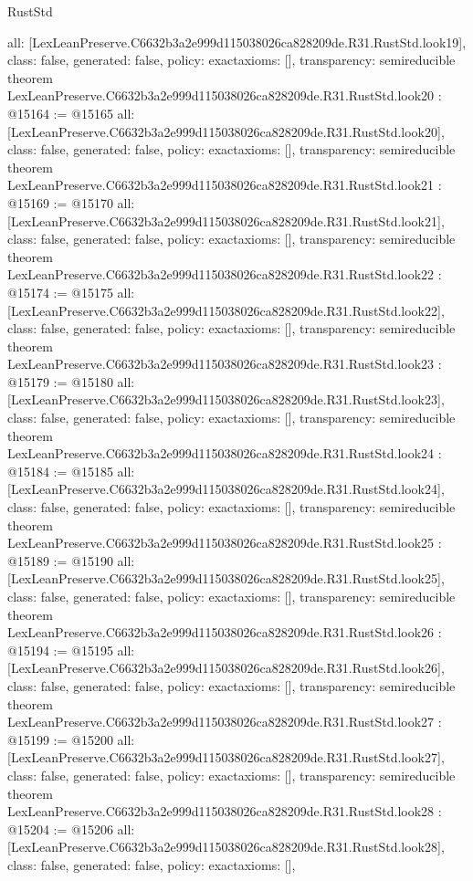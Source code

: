 \begin{lexlean}{RustStd}
\begin{coremodule}
{  all: [LexLeanPreserve.C6632b3a2e999d115038026ca828209de.R31.RustStd.look19],
  class: false,
  generated: false,
  policy: exact{axioms: []},
  transparency: semireducible
}
theorem LexLeanPreserve.C6632b3a2e999d115038026ca828209de.R31.RustStd.look20 : @15164 := @15165 {
  all: [LexLeanPreserve.C6632b3a2e999d115038026ca828209de.R31.RustStd.look20],
  class: false,
  generated: false,
  policy: exact{axioms: []},
  transparency: semireducible
}
theorem LexLeanPreserve.C6632b3a2e999d115038026ca828209de.R31.RustStd.look21 : @15169 := @15170 {
  all: [LexLeanPreserve.C6632b3a2e999d115038026ca828209de.R31.RustStd.look21],
  class: false,
  generated: false,
  policy: exact{axioms: []},
  transparency: semireducible
}
theorem LexLeanPreserve.C6632b3a2e999d115038026ca828209de.R31.RustStd.look22 : @15174 := @15175 {
  all: [LexLeanPreserve.C6632b3a2e999d115038026ca828209de.R31.RustStd.look22],
  class: false,
  generated: false,
  policy: exact{axioms: []},
  transparency: semireducible
}
theorem LexLeanPreserve.C6632b3a2e999d115038026ca828209de.R31.RustStd.look23 : @15179 := @15180 {
  all: [LexLeanPreserve.C6632b3a2e999d115038026ca828209de.R31.RustStd.look23],
  class: false,
  generated: false,
  policy: exact{axioms: []},
  transparency: semireducible
}
theorem LexLeanPreserve.C6632b3a2e999d115038026ca828209de.R31.RustStd.look24 : @15184 := @15185 {
  all: [LexLeanPreserve.C6632b3a2e999d115038026ca828209de.R31.RustStd.look24],
  class: false,
  generated: false,
  policy: exact{axioms: []},
  transparency: semireducible
}
theorem LexLeanPreserve.C6632b3a2e999d115038026ca828209de.R31.RustStd.look25 : @15189 := @15190 {
  all: [LexLeanPreserve.C6632b3a2e999d115038026ca828209de.R31.RustStd.look25],
  class: false,
  generated: false,
  policy: exact{axioms: []},
  transparency: semireducible
}
theorem LexLeanPreserve.C6632b3a2e999d115038026ca828209de.R31.RustStd.look26 : @15194 := @15195 {
  all: [LexLeanPreserve.C6632b3a2e999d115038026ca828209de.R31.RustStd.look26],
  class: false,
  generated: false,
  policy: exact{axioms: []},
  transparency: semireducible
}
theorem LexLeanPreserve.C6632b3a2e999d115038026ca828209de.R31.RustStd.look27 : @15199 := @15200 {
  all: [LexLeanPreserve.C6632b3a2e999d115038026ca828209de.R31.RustStd.look27],
  class: false,
  generated: false,
  policy: exact{axioms: []},
  transparency: semireducible
}
theorem LexLeanPreserve.C6632b3a2e999d115038026ca828209de.R31.RustStd.look28 : @15204 := @15206 {
  all: [LexLeanPreserve.C6632b3a2e999d115038026ca828209de.R31.RustStd.look28],
  class: false,
  generated: false,
  policy: exact{axioms: []},
}
\end{coremodule}
\end{lexlean}
